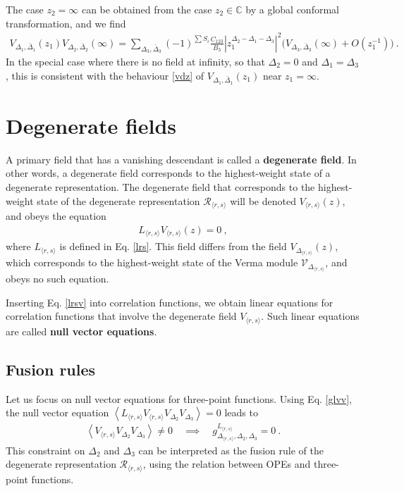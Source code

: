 \documentclass[12pt, a4paper, notitlepage, twoside]{report}
\numberwithin{equation}{section}
\theoremstyle{break}
\begin{document}
The case $z_2=\infty$ can be obtained from the case $z_2\in\mathbb{C}$ by a global conformal transformation, and we find 
\begin{align}
 V_{\Delta_1,\bar\Delta_1}(z_1) V_{\Delta_2,\bar\Delta_2}(\infty) =  \sum_{\Delta_3,\bar\Delta_3}(-1)^{\sum S_i}\frac{C_{123}}{B_3}\left| z_1^{\Delta_2-\Delta_1-\Delta_3}\right|^2 \Big( V_{\Delta_3,\bar\Delta_3}(\infty) + O\left(z_1^{-1}\right)\Big) \ .
 \label{iope}
\end{align}
In the special case where there is no field at infinity, so that $\Delta_2=0$ and $\Delta_1=\Delta_3$, this is consistent with the behaviour \eqref{vdz} of $V_{\Delta_1,\bar\Delta_1}(z_1)$ near $z_1=\infty$.


\section{Degenerate fields}\label{sec:degf}

A primary field that has a vanishing descendant is called a \textbf{\boldmath degenerate field}.
In other words, a degenerate field corresponds to the highest-weight state of a degenerate representation.
The degenerate field that corresponds to the highest-weight state of the degenerate representation $\mathcal{R}_{\langle r,s \rangle}$ will be denoted $V_{\langle r,s\rangle}(z)$, and obeys the equation 
\begin{align}
 L_{\langle r,s \rangle} V_{\langle r,s \rangle}(z) = 0 \ , 
\label{lrsv}
\end{align}
where $L_{\langle r,s \rangle}$ is defined in Eq. \eqref{lrs}.
This field differs from the field $V_{\Delta_{\langle r,s \rangle}}(z)$, which corresponds to the highest-weight state of the Verma module $\mathcal{V}_{\Delta_{\langle r,s \rangle}}$, and obeys no such equation.

Inserting Eq. \eqref{lrsv} into correlation functions, we obtain linear equations for correlation functions that involve the degenerate field $V_{\langle r,s\rangle}$. Such linear equations are called \textbf{\boldmath null vector equations}. 

\subsection{Fusion rules}\label{secfr}

Let us focus on null vector equations for three-point functions. 
Using Eq. \eqref{glvv},
the null vector equation $\left< L_{\langle r,s \rangle} V_{\langle r,s \rangle} V_{\Delta_2}V_{\Delta_3}\right>=0$ leads to
\begin{align}
 \left< V_{\langle r,s \rangle} V_{\Delta_2}V_{\Delta_3}\right>\neq 0 \quad \implies \quad g^{L_{\langle r,s \rangle}}_{\Delta_{\langle r,s \rangle},\Delta_2,\Delta_3} = 0 \ .
\end{align}
This constraint on $\Delta_2$ and $\Delta_3$ can be interpreted as the fusion rule of the degenerate representation $\mathcal{R}_{\langle r,s \rangle}$, using the relation between OPEs and three-point functions.
\end{document}
